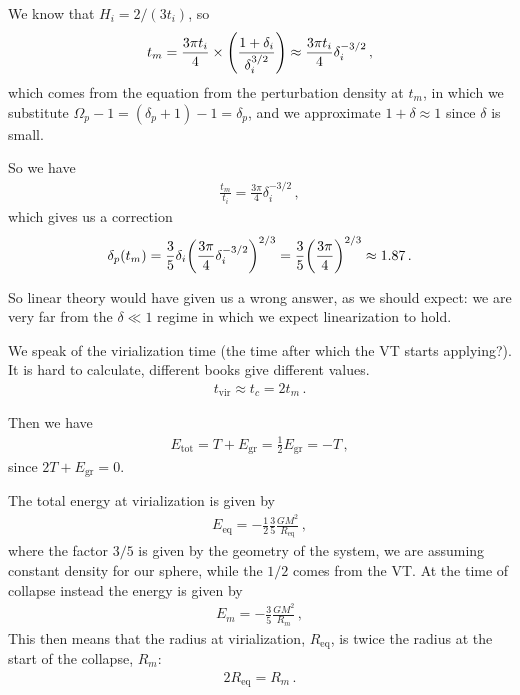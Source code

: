 \documentclass[main.tex]{subfiles}
\begin{document}
We know that \(H_i = 2/ (3 t_i)\), so 
%
\begin{align}
t_m = \frac{3 \pi t_i}{4} \times \qty(\frac{1 + \delta_{i}}{ \delta_{i}^{3/2}}) \approx \frac{3 \pi t_i}{4} \delta_{i}^{-3/2}
\,,
\end{align}
%
which comes from the equation from the perturbation density at \(t_m\), in which we substitute \(\Omega_{p} - 1 = (\delta_{p} + 1)  - 1 = \delta_{p}\), and we approximate \(1 + \delta \approx 1\) since \(\delta \) is small. 

So we have 
%
\begin{align}
\frac{t_m}{t_i} 
=\frac{3 \pi }{4} \delta_{i}^{-3/2}
\,,
\end{align}
%
which gives us a correction 
%
\begin{align}
\delta_{p}(t_m) =
\frac{3}{5} \delta_{i} \qty( \frac{3 \pi }{4} \delta_{i}^{-3/2})^{2/3}
=\frac{3}{5} \qty(\frac{3 \pi }{4})^{2/3} \approx 1.87
\,.
\end{align}

So linear theory would have given us a wrong answer, as we should expect: we are very far from the \(\delta \ll 1\) regime in which we expect linearization to hold. 

We speak of the virialization time (the time after which the VT starts applying?). It is hard to calculate, different books give different values. 
%
\begin{align}
t _{\text{vir}} \approx t_c = 2 t_m
\,.
\end{align}

Then we have 
%
\begin{align}
E _{\text{tot}} = T + E _{\text{gr}} = \frac{1}{2} E _{\text{gr}} = - T  
\,,
\end{align}
%
since \(2 T + E _{\text{gr}} = 0\).

The total energy at virialization is given by 
%
\begin{align}
E _{\text{eq}} = - \frac{1}{2} \frac{3}{5} \frac{GM^2}{R _{\text{eq}}}
\,,
\end{align}
%
where the factor \(3/5\) is given by the geometry of the system, we are assuming constant density for our sphere, while the \(1/2\) comes from the VT.  
At the time of collapse instead the energy is given by 
%
\begin{align}
E_m =- \frac{3}{5} \frac{GM^2}{R_m}
\,,
\end{align}
%
This then means that the radius at virialization, \(R _{\text{eq}}\), is twice the radius at the start of the collapse, \(R_m\): 
%
\begin{align}
2 R _{\text{eq}} = R_{m}
\,.
\end{align}
\end{document}
